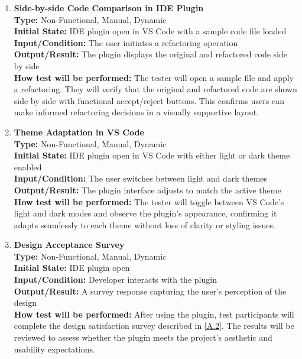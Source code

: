 \documentclass[12pt, titlepage]{article}
\begin{document}
\begin{enumerate}[label={\bf \textcolor{Maroon}{test-LF-\arabic*}},
    wide=0pt, font=\itshape]
    
  \item \textbf{Side-by-side Code Comparison in IDE Plugin} \\[2mm]
    \textbf{Type:} Non-Functional, Manual, Dynamic \\
    \textbf{Initial State:} IDE plugin open in VS Code with a sample
    code file loaded \\ 
    \textbf{Input/Condition:} The user initiates a refactoring operation \\ 
    \textbf{Output/Result:} The plugin displays the original and
    refactored code side by side \\[2mm]
    \textbf{How test will be performed:} The tester will open a
    sample file and apply a refactoring. They will verify that the
    original and refactored code are shown side by side with
    functional accept/reject buttons. This confirms users can make
    informed refactoring decisions in a visually supportive layout.

  \item \textbf{Theme Adaptation in VS Code} \\[2mm]
    \textbf{Type:} Non-Functional, Manual, Dynamic \\
    \textbf{Initial State:} IDE plugin open in VS Code with either
    light or dark theme enabled \\ 
    \textbf{Input/Condition:} The user switches between light and
    dark themes \\ 
    \textbf{Output/Result:} The plugin interface adjusts to match the
    active theme \\[2mm]
    \textbf{How test will be performed:} The tester will toggle between
    VS Code's light and dark modes and observe the plugin’s appearance,
    confirming it adapts seamlessly to each theme without loss of clarity
    or styling issues.

  \item \textbf{Design Acceptance Survey} \\[2mm]
    \textbf{Type:} Non-Functional, Manual, Dynamic \\
    \textbf{Initial State:} IDE plugin open \\ 
    \textbf{Input/Condition:} Developer interacts with the plugin \\ 
    \textbf{Output/Result:} A survey response capturing the user’s
    perception of the design \\[2mm]
    \textbf{How test will be performed:} After using the plugin,
    test participants will complete the design satisfaction survey
    described in \ref{A.2}. The results will be reviewed to assess
    whether the plugin meets the project's aesthetic and usability
    expectations.
    
\end{enumerate}
\end{document}
